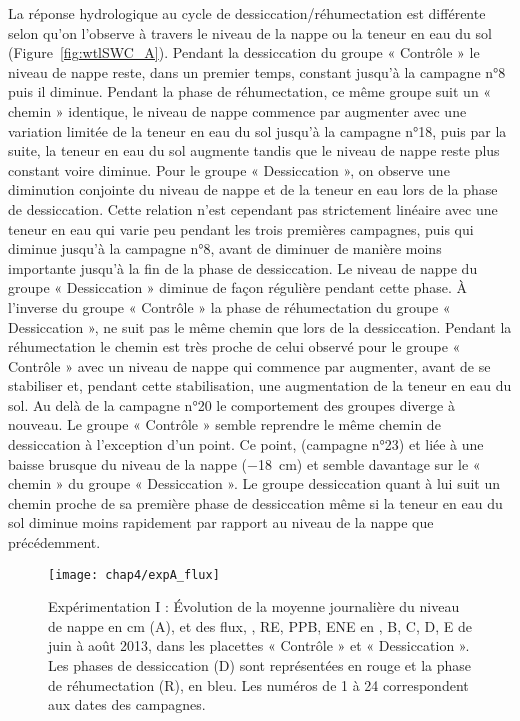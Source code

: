 La réponse hydrologique au cycle de dessiccation/réhumectation est différente selon qu'on l'observe à travers le niveau de la nappe ou la teneur en eau du sol (Figure~\ref{fig:wtlSWC_A}).
Pendant la dessiccation du groupe « Contrôle » le niveau de nappe reste, dans un premier temps, constant jusqu'à la campagne n°8 puis il diminue. 
Pendant la phase de réhumectation, ce même groupe suit un « chemin » identique, le niveau de nappe commence par augmenter avec une variation limitée de la teneur en eau du sol jusqu'à la campagne n°18, puis par la suite, la teneur en eau du sol augmente tandis que le niveau de nappe reste plus constant voire diminue.
Pour le groupe « Dessiccation », on observe une diminution conjointe du niveau de nappe et de la teneur en eau lors de la phase de dessiccation.
Cette relation n'est cependant pas strictement linéaire avec une teneur en eau qui varie peu pendant les trois premières campagnes, puis qui diminue jusqu'à la campagne n°8, avant de diminuer de manière moins importante jusqu'à la fin de la phase de dessiccation.
Le niveau de nappe du groupe « Dessiccation » diminue de façon régulière pendant cette phase.
À l'inverse du groupe « Contrôle » la phase de réhumectation du groupe « Dessiccation », ne suit pas le même chemin que lors de la dessiccation.
Pendant la réhumectation le chemin est très proche de celui observé pour le groupe « Contrôle » avec un niveau de nappe qui commence par augmenter, avant de se stabiliser et, pendant cette stabilisation, une augmentation de la teneur en eau du sol.
Au delà de la campagne n°20 le comportement des groupes diverge à nouveau.
Le groupe « Contrôle » semble reprendre le même chemin de dessiccation à l'exception d'un point.
Ce point, (campagne n°23) et liée à une baisse brusque du niveau de la nappe (\SI{-18}{\centi\metre}) et semble davantage sur le « chemin » du groupe « Dessiccation ».
Le groupe dessiccation quant à lui suit un chemin proche de sa première phase de dessiccation même si la teneur en eau du sol diminue moins rapidement par rapport au niveau de la nappe que précédemment.


\begin{figure}
\centering
\texttt{[image: chap4/expA\_flux]}
\caption{Expérimentation I : Évolution de la moyenne journalière du niveau de nappe en cm (A), et des flux, \chh, RE, PPB, ENE en \si{\uml}, B, C, D, E de juin à août 2013, dans les placettes « Contrôle » et « Dessiccation ». Les phases de dessiccation (D) sont représentées en rouge et la phase de réhumectation (R), en bleu. Les numéros de 1 à 24 correspondent aux dates des campagnes.}
\label{fig:HMzi}
\end{figure}

